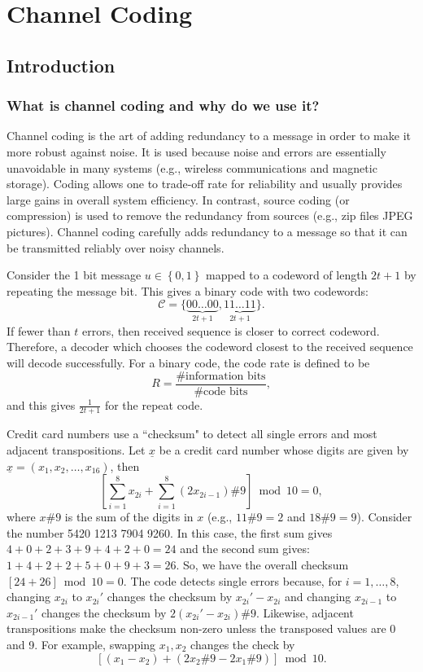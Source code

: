 \chapter{Channel Coding}
\label{chapter:ChannelCoding}

\section{Introduction}

\subsection{What is channel coding and why do we use it?}

Channel coding is the art of adding redundancy to a message in order to make it more robust against noise.
It is used because noise and errors are essentially unavoidable in many systems (e.g., wireless communications and magnetic storage).
Coding allows one to trade-off rate for reliability and usually provides large gains in overall system efficiency.
In contrast, source coding (or compression) is used to remove the redundancy from sources (e.g., zip files JPEG pictures).
Channel coding carefully adds redundancy to a message so that it can be transmitted reliably over noisy channels. 

\begin{example}
Consider the 1 bit message $u\in\left\{ 0,1\right\} $ mapped to a codeword of length $2t+1$ by repeating the message bit.
This gives a binary code with two codewords:
\[ \mathcal{C}=\{\underbrace{00\ldots00}_{2t+1},\underbrace{11\ldots11}_{2t+1}\}. \]
If fewer than $t$ errors, then received sequence is closer to correct codeword.
Therefore, a decoder which chooses the codeword closest to the received sequence will decode successfully.
For a binary code, the code rate is defined to be
\[R=\frac{\mbox{\# information bits}}{\mbox{\# code bits}},\]
and this gives $\frac{1}{2t+1}$ for the repeat code.
\end{example}


\begin{example}
Credit card numbers use a ``checksum" to detect all single errors and most adjacent transpositions.
Let $\underline{x}$ be a credit card number whose digits are given by $\underline{x}=\left(x_{1},x_{2},\ldots,x_{16}\right)$,
then
\[ \left[\sum_{i=1}^{8}x_{2i}+\sum_{i=1}^{8}\left(2x_{2i-1}\right)\# 9 \right]\bmod10=0,\]
where $x\# 9$ is the sum of the digits in $x$ (e.g., $11\# 9=2$ and $18\# 9=9$).
Consider the number 5420 1213 7904 9260.
In this case, the first sum gives $4+0+2+3+9+4+2+0=24$ and the second sum gives: $1+4+2+2+5+0+9+3=26$.
So, we have the overall checksum $\left[24+26\right]\bmod10=0$.
The code detects single errors because, for $i=1,\ldots,8$, changing $x_{2i}$ to $x_{2i}'$ changes the checksum by $x_{2i}'-x_{2i}$ and changing $x_{2i-1}$ to $x_{2i-1}'$ changes the checksum by $2(x_{2i}'-x_{2i})\# 9$.
Likewise, adjacent transpositions make the checksum non-zero unless the transposed values are 0 and 9.
For example, swapping $x_{1},x_{2}$ changes the check by
\[ \left[(x_{1}-x_{2})+(2x_{2}\# 9-2x_{1}\# 9)\right]\bmod10. \]
\end{example}

